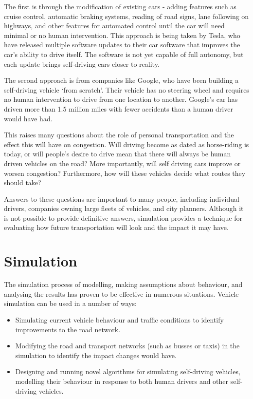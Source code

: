 \documentclass[ %
                    author={Alexander Hill},
                supervisor={Dr. Benjamin Sach},
                    degree={MEng},
                     title={MARMOSET},
                  subtitle={Multi-Agent Route Management using Online Simulation for Efficient Transportation},
                      type={research},
                      year={2016} ]{dissertation}
\begin{document}
The first is through the modification of existing cars - adding features such as
cruise control, automatic braking systems, reading of road signs, lane following
on highways, and other features for automated control until the car will need
minimal or no human intervention. This approach is being taken by Tesla, who
have released multiple software updates to their car software that improves the
car's ability to drive itself. The software is not yet capable of full autonomy,
but each update brings self-driving cars closer to reality.

The second approach is from companies like Google, who have been building a
self-driving vehicle `from scratch'. Their vehicle has no steering wheel and
requires no human intervention to drive from one location to another.  Google's
car has driven more than 1.5 million miles with fewer accidents than a human
driver would have had.

This raises many questions about the role of personal transportation and the
effect this will have on congestion. Will driving become as dated as
horse-riding is today, or will people's desire to drive mean that there will
always be human driven vehicles on the road? More importantly, will self driving
cars improve or worsen congestion? Furthermore, how will these vehicles decide
what routes they should take?

Answers to these questions are important to many people, including individual
drivers, companies owning large fleets of vehicles, and city planners. Although
it is not possible to provide definitive answers, simulation provides a
technique for evaluating how future transportation will look and the impact it
may have.

\section{Simulation}

The simulation process of modelling, making assumptions about behaviour, and
analysing the results has proven to be effective in numerous situations.
Vehicle simulation can be used in a number of ways:

\begin{itemize}
    \item Simulating current vehicle behaviour and traffic conditions to
        identify improvements to the road network.
    \item Modifying the road and transport networks (such as busses or taxis) in
        the simulation to identify the impact changes would have.
    \item Designing and running novel algorithms for simulating self-driving
        vehicles, modelling their behaviour in response to both human drivers
        and other self-driving vehicles.
\end{itemize}
\end{document}
